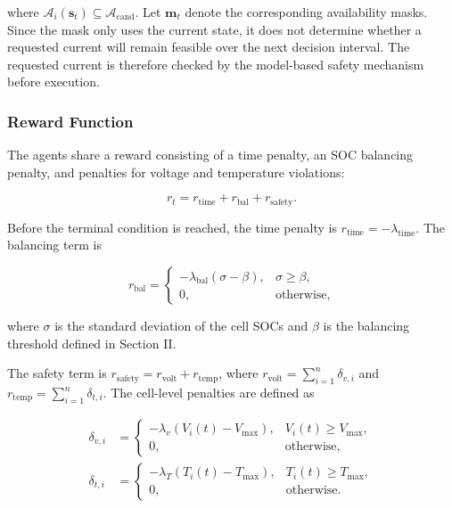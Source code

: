 where $\mathcal{A}_i(\mathbf{s}_t)\subseteq\mathcal{A}_{\mathrm{cand}}$. Let $\mathbf{m}_t$ denote the corresponding availability masks. Since the mask only uses the current state, it does not determine whether a requested current will remain feasible over the next decision interval. The requested current is therefore checked by the model-based safety mechanism before execution.

\subsubsection{Reward Function}

The agents share a reward consisting of a time penalty, an SOC balancing penalty, and penalties for voltage and temperature violations:

\begin{equation}
\label{eq:reward}
r_t
=
r_{\mathrm{time}}
+
r_{\mathrm{bal}}
+
r_{\mathrm{safety}}.
\end{equation}

Before the terminal condition is reached, the time penalty is $r_{\mathrm{time}}=-\lambda_{\mathrm{time}}$. The balancing term is

\begin{equation}
\label{eq:balance_reward}
r_{\mathrm{bal}}
=
\begin{cases}
-\lambda_{\mathrm{bal}}(\sigma-\beta),
& \sigma\geq\beta,\\
0,
& \text{otherwise},
\end{cases}
\end{equation}

where $\sigma$ is the standard deviation of the cell SOCs and $\beta$ is the balancing threshold defined in Section II.

The safety term is
$r_{\mathrm{safety}}=r_{\mathrm{volt}}+r_{\mathrm{temp}}$,
where
$r_{\mathrm{volt}}=\sum_{i=1}^{n}\delta_{v,i}$ and
$r_{\mathrm{temp}}=\sum_{i=1}^{n}\delta_{t,i}$.
The cell-level penalties are defined as

\begin{equation}
\label{eq:safety_reward}
\begin{aligned}
\delta_{v,i}
&=
\begin{cases}
-\lambda_v\left(V_i(t)-V_{\max}\right),
& V_i(t)\geq V_{\max},\\
0,
& \text{otherwise},
\end{cases}
\\[4pt]
\delta_{t,i}
&=
\begin{cases}
-\lambda_T\left(T_i(t)-T_{\max}\right),
& T_i(t)\geq T_{\max},\\
0,
& \text{otherwise}.
\end{cases}
\end{aligned}
\end{equation}

